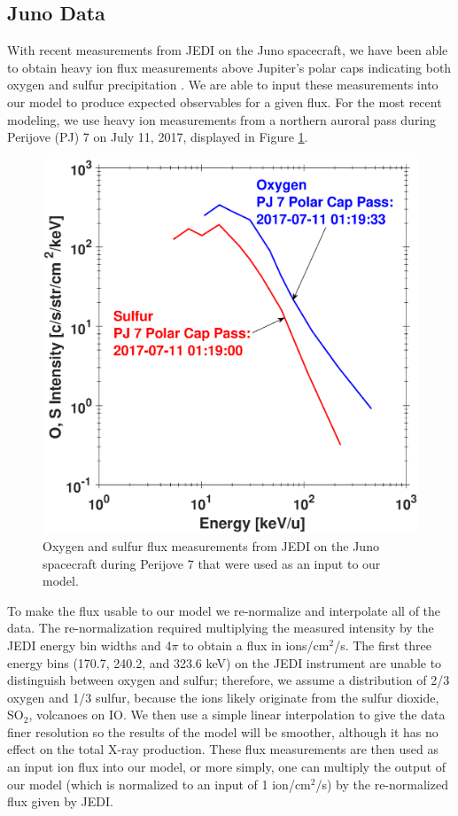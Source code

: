 \documentclass[draft]{agujournal2018}
\begin{document}
\subsection{Juno Data}

With recent measurements from JEDI \citep{mauk2017ssr} on the Juno spacecraft, we have been able to obtain heavy ion flux measurements above Jupiter's polar caps indicating both oxygen and sulfur precipitation \citep{haggerty2017,clark2017a,clark2017b}.
We are able to input these measurements into our model to produce expected observables for a given flux.
For the most recent modeling, we use heavy ion measurements from a northern auroral pass during Perijove (PJ) 7 on July 11, 2017, displayed in Figure \ref{fig:JEDIFlux}.

\begin{figure}[ht]
    \centering
    \includegraphics[width=\textwidth]{Figures/O+S_PJ7.eps}
    \caption{Oxygen and sulfur flux measurements from JEDI on the Juno spacecraft during Perijove 7 that were used as an input to our model.}
    \label{fig:JEDIFlux}
\end{figure}

To make the flux usable to our model we re-normalize and interpolate all of the data.
The re-normalization required multiplying the measured intensity by the JEDI energy bin widths \citep{mauk2017ssr} and 4$\pi$ to obtain a flux in ions/cm$^2$/s.
The first three energy bins (170.7, 240.2, and 323.6 keV) on the JEDI instrument are unable to distinguish between oxygen and sulfur; therefore, we assume a distribution of 2/3 oxygen and 1/3 sulfur, because the ions likely originate from the sulfur dioxide, SO$_2$, volcanoes on IO.
We then use a simple linear interpolation to give the data finer resolution so the results of the model will be smoother, although it has no effect on the total X-ray production.
These flux measurements are then used as an input ion flux into our model, or more simply, one can multiply the output of our model (which is normalized to an input of 1 ion/cm$^2$/s) by the re-normalized flux given by JEDI.
\end{document}
